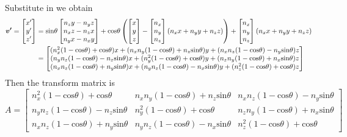 \documentclass[11pt]{article}
\begin{document}
Substitute in we obtain
\begin{equation}
\begin{aligned}
    \bm{v'} = \begin{bmatrix}
    x'\\ y' \\ z' \\
    \end{bmatrix} &= \text{sin}\theta \begin{bmatrix}
    n_{z}y-n_{y}z \\
    n_{x}z-n_{z}x \\
    n_{y}x-n_{x}y \\
    \end{bmatrix}
    + \text{cos}\theta 
    \left( \begin{bmatrix}
    x \\ y \\ z \\
    \end{bmatrix} -
    \begin{bmatrix}
    n_{x} \\ n_{y} \\ n_{z} \\
    \end{bmatrix}
    (n_{x}x + n_{y}y + n_{z}z) \right)
     + 
    \begin{bmatrix}
    n_{x} \\ n_{y} \\ n_{z} \\
    \end{bmatrix}
    (n_{x}x + n_{y}y + n_{z}z) \\
    &= \begin{bmatrix}
    (n_{x}^2 (1-\text{cos}\theta) +\text{cos}\theta )x + (n_{x}n_{y}(1-\text{cos}\theta) + n_{z}\text{sin}\theta ) y + (n_{x}n_{z} (1-\text{cos}\theta) - n_{y}\text{sin}\theta )z \\
    (n_{y}n_{z}(1-\text{cos}\theta) - n_{z}\text{sin}\theta)x + (n_{y}^2 (1-\text{cos}\theta) + \text{cos}\theta )y + (n_{z}n_{y}(1- \text{cos}\theta) + n_{x}\text{sin}\theta)z \\
    (n_{x}n_{z}(1-\text{cos}\theta) + n_{y}\text{sin}\theta)x + (n_{y}n_{z}(1-\text{cos}\theta) - n_{x}\text{sin}\theta)y + (n_{z}^2(1-\text{cos}\theta) + \text{cos}\theta)z
    \end{bmatrix} \notag
\end{aligned}
\end{equation}
Then the transform matrix is
\begin{equation}
    A = \begin{bmatrix}
    n_{x}^2 (1-\text{cos}\theta) +\text{cos}\theta & n_{x}n_{y}(1-\text{cos}\theta) + n_{z}\text{sin}\theta &  n_{x}n_{z} (1-\text{cos}\theta) - n_{y}\text{sin}\theta \\
    n_{y}n_{z}(1-\text{cos}\theta) - n_{z}\text{sin}\theta & n_{y}^2 (1-\text{cos}\theta) + \text{cos}\theta & n_{z}n_{y}(1- \text{cos}\theta) + n_{x}\text{sin}\theta \\
    n_{x}n_{z}(1-\text{cos}\theta) + n_{y}\text{sin}\theta & n_{y}n_{z}(1-\text{cos}\theta) - n_{x}\text{sin}\theta & n_{z}^2(1-\text{cos}\theta) + \text{cos}\theta
    \end{bmatrix}
\end{equation}
\end{document}
